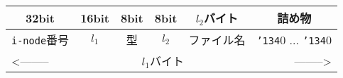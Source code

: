 \documentclass[border=1mm]{standalone}
\newcommand{\inode}{\texttt{i-node}}
\newcommand{\bs}{\texttt{\char'134}}  %
\begin{document}
\ttfamily\begin{tabular}{|c|c|c|c|c|c|}
\multicolumn{1}{c}{32bit} &
\multicolumn{1}{c}{16bit} &
\multicolumn{1}{c}{\scriptsize 8bit} &
\multicolumn{1}{c}{\scriptsize 8bit} &
\multicolumn{1}{c}{$l_2$バイト} &
\multicolumn{1}{c}{詰め物} \\\hline
\inode 番号 & $l_1$ & 型 & $l_2$ & ファイル名 & \bs0 ... \bs0 \\\hline
\multicolumn{1}{l}{<--------} &
\multicolumn{4}{c}{$l_1$バイト} &
\multicolumn{1}{r}{-------->} \\
\end{tabular}
\end{document}
